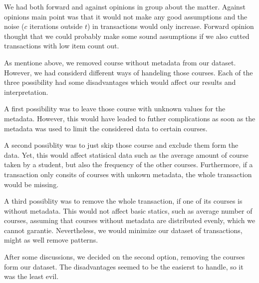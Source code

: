 We had both forward and against opinions
in group about the matter. Against opinions main point was that it would not make any good assumptions 
and the noise ($c$ iterations outside $t$) in transactions would only increase. Forward opinion thought that
we could probably make some sound assumptions if we also cutted transactions with low item count out.


As mentione above, we removed course without metadata from our dataset. However, we had considerd different ways of handeling those courses.
Each of the three possibility had  some disadvantages which would affect our results and interpretation.


A first possibility was to leave those course with unknown values for the metadata. However, this would have leaded to 
futher complications as soon as the metadata was used to limit the considered data to certain courses. 


A second possiblity was to just skip those course and exclude them form the data. Yet, this would affect
statisical data such as the average amount of course taken by a student, but also the frequency of the other courses.
Furthermore, if a transaction only consits of courses with unkown metadata, the whole transaction would be missing.


A third possiblity was to remove the whole transaction, if one of its courses is without metadata. 
This would not affect basic statics, such as average number of courses, assuming that courses without metadata are distributed evenly, which we cannot garantie.
Nevertheless, we would minimize our dataset of transactions, might as well remove patterns.
\newline

After some discussions, we decided on the second option, removing the courses form our dataset. The disadvantages seemed to be the easierst to handle, so it was the least evil. 



